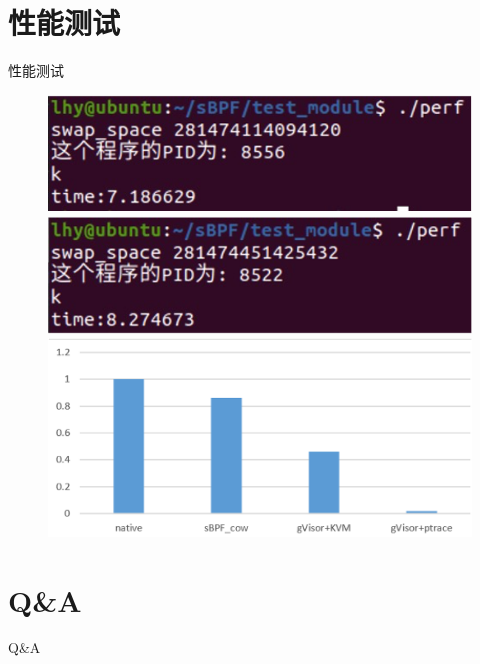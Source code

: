 \documentclass[UTF8,fontset=macnew,xcolor=table]{ctexbeamer}
\begin{document}
\section{性能测试}
\begin{frame}{性能测试}

\begin{figure}[H]
    \centering
    \includegraphics[width=0.4\columnwidth]{pic11.png}
    \includegraphics[width=0.4\columnwidth]{pic12.png}
    \includegraphics[width=0.8\columnwidth]{pic13.png}
\end{figure}
    
\end{frame}

\section{Q\&A}
\begin{frame}{Q\&A}
    
\end{frame}
\end{document}
